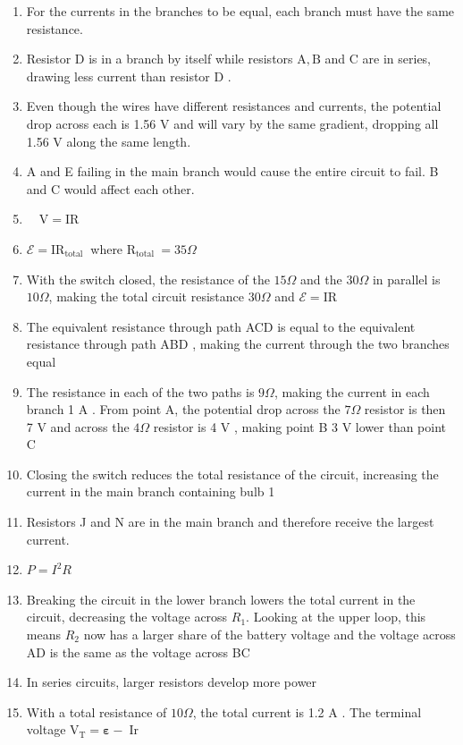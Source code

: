 \begin{enumerate}
\begin{enumerate}
  \item For the currents in the branches to be equal, each branch must have the same resistance.
  \item Resistor D is in a branch by itself while resistors $\mathrm{A}, \mathrm{B}$ and C are in series, drawing less current than resistor D .
  \item Even though the wires have different resistances and currents, the potential drop across each is 1.56 V and will vary by the same gradient, dropping all 1.56 V along the same length.
  \item A and E failing in the main branch would cause the entire circuit to fail. B and C would affect each other.
  \item $\quad \mathrm{V}=\mathrm{IR}$
  \item $\boldsymbol{\mathcal { E }}=\mathrm{IR}_{\text {total }}$ where $\mathrm{R}_{\text {total }}=35 \Omega$
  \item With the switch closed, the resistance of the $15 \Omega$ and the $30 \Omega$ in parallel is $10 \Omega$, making the total circuit resistance $30 \Omega$ and $\boldsymbol{\mathcal { E }}=\mathrm{IR}$
  \item The equivalent resistance through path ACD is equal to the equivalent resistance through path ABD , making the current through the two branches equal
  \item The resistance in each of the two paths is $9 \Omega$, making the current in each branch 1 A . From point A, the potential drop across the $7 \Omega$ resistor is then 7 V and across the $4 \Omega$ resistor is 4 V , making point B 3 V lower than point C
  \item Closing the switch reduces the total resistance of the circuit, increasing the current in the main branch containing bulb 1
  \item Resistors J and N are in the main branch and therefore receive the largest current.
  \item $P=I^{2} R$
  \item Breaking the circuit in the lower branch lowers the total current in the circuit, decreasing the voltage across $R_{1}$. Looking at the upper loop, this means $R_{2}$ now has a larger share of the battery voltage and the voltage across AD is the same as the voltage across BC
  \item In series circuits, larger resistors develop more power
  \item With a total resistance of $10 \Omega$, the total current is 1.2 A . The terminal voltage $\mathrm{V}_{\mathrm{T}}=\boldsymbol{\varepsilon}-\operatorname{Ir}$

\end{enumerate}
\end{enumerate}
